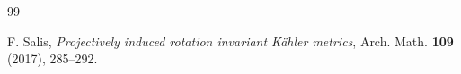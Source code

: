 \documentclass[11pt, reqno]{amsart}
\newcommand{\K }{K\"{a}hler }
\newcommand{\KE }{K\"{a}hler-Einstein }
\begin{document}
{\begin{thebibliography}{99}


 F. Salis, {\em Projectively induced rotation invariant \K metrics}, Arch. Math. \textbf{109} (2017),  285--292.












\end{thebibliography}}
\end{document}
